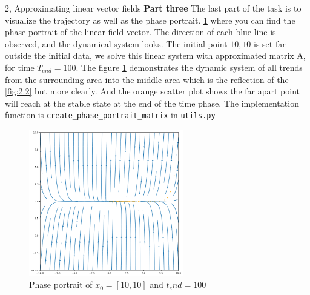 \begin{task}{2, Approximating linear vector fields}
\textbf{Part three}
The last part of the task is to visualize the trajectory as well as the phase portrait. \ref{fig:2.3} where you can find the phase portrait of the linear field vector. The direction of each blue line is observed, and the dynamical system looks. The initial point ${10, 10 }$ is set far outside the initial data, we solve this linear system with approximated matrix A, for time $T_{end} = 100 $.  The figure \ref{fig:2.3} demonstrates the dynamic system of all trends from the surrounding area into the middle area which is the reflection of the \ref{fig:2.2} but more clearly. And the orange scatter plot shows the far apart point will reach at the stable state at the end of the time phase. The implementation function is \verb|create_phase_portrait_matrix| in \verb|utils.py|
\begin{figure}[H]
\centering
\includegraphics[width=0.6\textwidth]{images/task2_3.png}
\caption{Phase portrait of \(x_0 = [10,10]\) and  \(t_end = 100\)}
\label{fig:2.3}
\end{figure}
\end{task}
